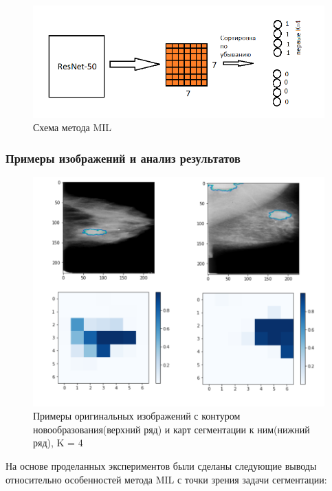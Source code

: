 \begin{figure}[h] 
  \center
  \includegraphics [scale=0.8] {images/schema_mil.png}
  \caption{Схема метода MIL} 
  \label{fig:example_mil}  
\end{figure}

\subsubsection{Примеры изображений и анализ результатов}


\begin{figure}[h] 
  \center
  \includegraphics [scale=0.6] {images/mil.png}
  \caption{Примеры оригинальных изображений с контуром новообразования(верхний ряд) и карт сегментации к ним(нижний ряд), K = 4} 
  \label{fig:schema_mil}  
\end{figure}


На основе проделанных экспериментов были сделаны следующие выводы относительно особенностей метода MIL с точки зрения задачи сегментации:


